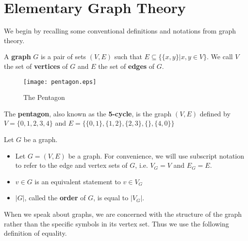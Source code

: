 \section{Elementary Graph Theory}




We begin by recalling some conventional definitions and notations from graph
theory.

\begin{definition}
  A \textbf{graph} $G$ is a pair of sets $(V,E)$ such that
  $E \subseteq \{ \{x,y\} | x,y \in V \}$. We call $V$ the set of
  \textbf{vertices} of $G$ and $E$ the set of \textbf{edges} of $G$.
\end{definition}


\begin{figure}
  \begin{center}
    \texttt{[image: pentagon.eps]}
  \end{center}
  \caption{The Pentagon}
\end{figure}

\begin{example}
  The \textbf{pentagon}, also known as the \textbf{5-cycle}, is the graph
  $(V,E)$ defined by $V = \{0,1,2,3,4\}$ and
  $E = \{\{0,1\},\{1,2\},\{2,3\},\{\},\{4,0\}\}$

\end{example}



\begin{remark}[Notation]
  Let $G$ be a graph.

  \begin{itemize}
  \item Let $G = (V,E)$ be a graph. For convenience, we will use subscript
    notation to refer to the edge and vertex sets of $G$, i.e. $V_G = V$ and
    $E_G = E$.
  \item $v \in G$ is an equivalent statement to $v \in V_G$
  \item $|G|$, called the \textbf{order} of $G$, is equal to $|V_G|$.
  \end{itemize}
\end{remark}

When we speak about graphs, we are concerned with the structure of the graph
rather than the specific symbols in its vertex set. Thus we use the following
definition of equality.

